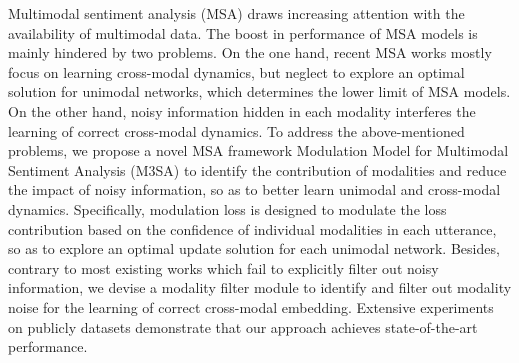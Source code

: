 Multimodal sentiment analysis (MSA) draws increasing attention with the availability of multimodal data. The boost in performance of MSA models is mainly hindered by two problems. On the one hand, recent MSA works mostly focus on learning cross-modal dynamics, but neglect to explore an optimal solution for unimodal networks, which determines the lower limit of MSA models. On the other hand, noisy information hidden in each modality interferes the learning of correct cross-modal dynamics. To address the above-mentioned problems, we propose a novel MSA framework Modulation Model for Multimodal Sentiment Analysis (M3SA) to identify the contribution of modalities and reduce the impact of noisy information, so as to better learn unimodal and cross-modal dynamics. Specifically, modulation loss is designed to modulate the loss contribution based on the confidence of individual modalities in each utterance, so as to explore an optimal update solution for each unimodal network. Besides, contrary to most existing works which fail to explicitly filter out noisy information, we devise a modality filter module to identify and filter out modality noise for the learning of correct cross-modal embedding. Extensive experiments on publicly datasets demonstrate that our approach achieves state-of-the-art performance.
